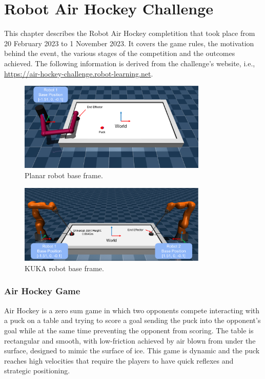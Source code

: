\chapter{Robot Air Hockey Challenge}
\label{ch:robot_air_hockey_challenge}
This chapter describes the Robot Air Hockey completition that took place from 20 February 2023 to 1 November 2023.
It covers the game rules, the motivation behind the event, the various stages of the competition and the outcomes achieved.
The following information is derived from the challenge's website, i.e., \url{https://air-hockey-challenge.robot-learning.net}.

\begin{figure}[h]
    \centering
    \includegraphics[width=0.8\textwidth]{Images/3dof_planar_env.png}
    \caption{Planar robot base frame.}
    \label{fig:planar_env}
\end{figure}


\begin{figure}[h]
    \centering
    \includegraphics[width=0.8\textwidth]{Images/kuka_env.png}
    \caption{KUKA robot base frame.}
    \label{fig:kuka_env}
\end{figure}

\subsection{Air Hockey Game}
Air Hockey is a zero sum game in which two opponents compete interacting with a puck on a table and trying to score a goal
sending the puck into the opponent's goal while at the same time preventing the opponent from scoring.
The table is rectangular and smooth, with low-friction achieved by air blown from under the surface, designed to mimic the surface of ice.
This game is dynamic and the puck reaches high velocities that require the players to have quick reflexes and strategic positioning.

